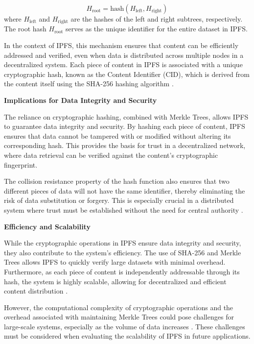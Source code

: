 \documentclass[final]{rc-book-2.14}
\begin{document}
\[
    H_{\text{root}} = \text{hash}(H_{\text{left}}, H_{\text{right}})
\]
where $H_{\text{left}}$ and $H_{\text{right}}$ are the hashes of the left and right subtrees, respectively. The root hash $H_{\text{root}}$ serves as the unique identifier for the entire dataset in IPFS.

In the context of IPFS, this mechanism ensures that content can be efficiently addressed and verified, even when data is distributed across multiple nodes in a decentralized system. Each piece of content in IPFS is associated with a unique cryptographic hash, known as the Content Identifier (CID), which is derived from the content itself using the SHA-256 hashing algorithm \cite{ipfs2015}.

\textbf{Implications for Data Integrity and Security}

The reliance on cryptographic hashing, combined with Merkle Trees, allows IPFS to guarantee data integrity and security. By hashing each piece of content, IPFS ensures that data cannot be tampered with or modified without altering its corresponding hash. This provides the basis for trust in a decentralized network, where data retrieval can be verified against the content's cryptographic fingerprint.

The collision resistance property of the hash function also ensures that two different pieces of data will not have the same identifier, thereby eliminating the risk of data substitution or forgery. This is especially crucial in a distributed system where trust must be established without the need for central authority \cite{cachin2016blockchains}.

\textbf{Efficiency and Scalability}

While the cryptographic operations in IPFS ensure data integrity and security, they also contribute to the system's efficiency. The use of SHA-256 and Merkle Trees allows IPFS to quickly verify large datasets with minimal overhead. Furthermore, as each piece of content is independently addressable through its hash, the system is highly scalable, allowing for decentralized and efficient content distribution \cite{budiu2007designing}.

However, the computational complexity of cryptographic operations and the overhead associated with maintaining Merkle Trees could pose challenges for large-scale systems, especially as the volume of data increases \cite{tapscott2016blockchain}. These challenges must be considered when evaluating the scalability of IPFS in future applications.
\end{document}

